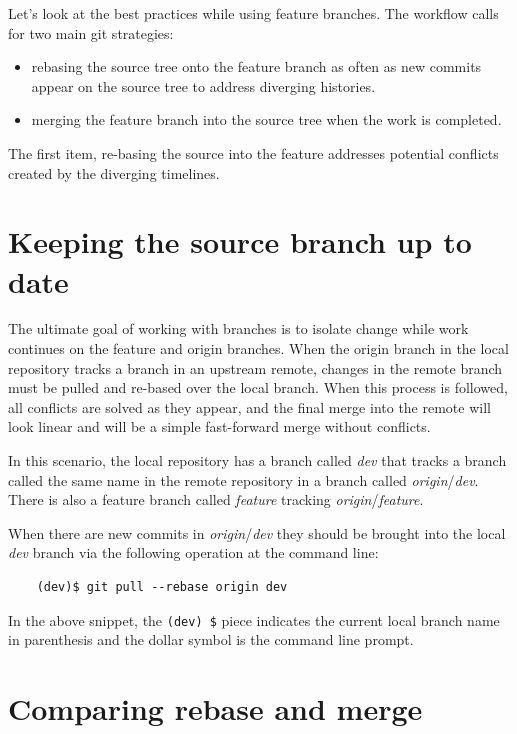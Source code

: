 \documentclass[10pt]{article}
\begin{document}
Let's look at the best practices while using feature branches.
The workflow calls for two main git strategies:

\begin{itemize}
    \item rebasing the source tree onto the feature branch as often as new commits appear on the source tree to address diverging histories.
    \item merging the feature branch into the source tree when the work is completed.
\end{itemize}

The first item, re-basing the source into the feature addresses potential conflicts created by the diverging timelines.

\section{Keeping the source branch up to date}

The ultimate goal of working with branches is to isolate change while work continues on the feature and origin branches.
When the origin branch in the local repository tracks a branch in an upstream remote, changes in the remote branch must be pulled and re-based over the local branch.
When this process is followed, all conflicts are solved as they appear, and the final merge into the remote will look linear and will be a simple fast-forward merge without conflicts.

In this scenario, the local repository has a branch called \textit{dev} that tracks a branch called the same name in the remote repository in a branch called \textit{origin}/\textit{dev}.
There is also a feature branch called \textit{feature} tracking \textit{origin}/\textit{feature}.

When there are new commits in \textit{origin}/\textit{dev} they should be brought into the local \textit{dev} branch via the following operation at the command line:

\begin{verbatim}
    (dev)$ git pull --rebase origin dev 
\end{verbatim}


In the above snippet, the \verb|(dev) $| piece indicates the current local branch name in parenthesis and the dollar symbol is the command line prompt.

\clearpage
\section{Comparing rebase and merge}
\label{sec:rebaseVsmeerge}
\end{document}
